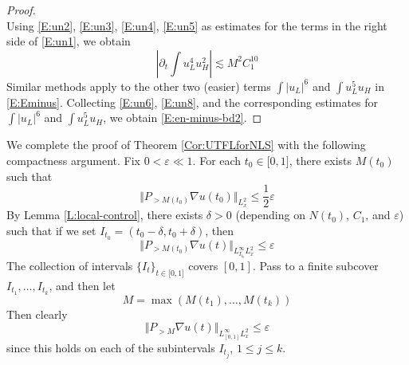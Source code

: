 \documentclass[12pt,letterpaper,leqno]{amsart}
\theoremstyle{plain}
\numberwithin{equation}{section}
\numberwithin{theorem}{section}
\numberwithin{proposition}{section}
\numberwithin{lemma}{section}
\numberwithin{corollary}{section}
\begin{document}
\begin{proof}
\begin{equation}
\end{equation}%
Using \eqref{E:un2}, \eqref{E:un3}, \eqref{E:un4}, \eqref{E:un5} as
estimates for the terms in the right side of \eqref{E:un1}, we obtain 
\begin{equation}
\left\vert \partial _{t}\int u_{L}^{4}u_{H}^{2}\right\vert \lesssim
M^{2}C_{1}^{10}  \label{E:un8}
\end{equation}%
Similar methods apply to the other two (easier) terms $\int |u_{L}|^{6}$ and 
$\int u_{L}^{5}u_{H}$ in \eqref{E:Eminus}. Collecting \eqref{E:un6}, %
\eqref{E:un8}, and the corresponding estimates for $\int |u_{L}|^{6}$ and $%
\int u_{L}^{5}u_{H}$, we obtain \eqref{E:en-minus-bd2}.
\end{proof}

We complete the proof of Theorem \ref{Cor:UTFLforNLS} with the following
compactness argument. Fix $0<\varepsilon \ll 1$. For each $t_{0}\in \lbrack
0,1]$, there exists $M(t_{0})$ such that 
\begin{equation*}
\Vert P_{>M(t_{0})}\nabla u(t_{0})\Vert _{L_{x}^{2}}\leq \frac{1}{2}%
\varepsilon
\end{equation*}%
By Lemma \ref{L:local-control}, there exists $\delta >0$ (depending on $%
N(t_{0})$, $C_{1}$, and $\varepsilon $) such that if we set $%
I_{t_{0}}=(t_{0}-\delta ,t_{0}+\delta )$, then 
\begin{equation*}
\Vert P_{>M(t_{0})}\nabla u(t)\Vert _{L_{I_{t_{0}}}^{\infty }L_{x}^{2}}\leq
\varepsilon
\end{equation*}%
The collection of intervals $\{I_{t}\}_{t\in \lbrack 0,1]}$ covers $[0,1]$.
Pass to a finite subcover $I_{t_{1}},\ldots ,I_{t_{k}}$, and then let 
\begin{equation*}
M=\max (M(t_{1}),\ldots ,M(t_{k}))
\end{equation*}%
Then clearly 
\begin{equation*}
\Vert P_{>M}\nabla u(t)\Vert _{L_{[0,1]}^{\infty }L_{x}^{2}}\leq \varepsilon
\end{equation*}%
since this holds on each of the subintervals $I_{t_{j}}$, $1\leq j\leq k$.
\end{document}
